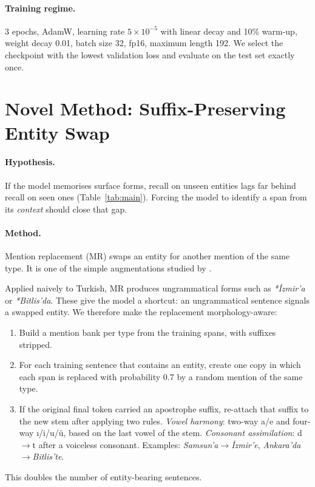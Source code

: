 \documentclass[11pt]{article}
\begin{document}
\paragraph{Training regime.} 3 epochs, AdamW, learning rate $5{\times}10^{-5}$ with linear decay and 10\% warm-up, weight decay 0.01, batch size 32, fp16, maximum length 192. We select the checkpoint with the lowest validation loss and evaluate on the test set exactly once.

\section{Novel Method: Suffix-Preserving Entity Swap}
\paragraph{Hypothesis.} If the model memorises surface forms, recall on unseen entities lags far behind recall on seen ones (Table~\ref{tab:main}). Forcing the model to identify a span from its \emph{context} should close that gap.

\paragraph{Method.} Mention replacement (MR) swaps an entity for another mention of the same type. It is one of the simple augmentations studied by \citet{dai2020analysis}.

Applied naively to Turkish, MR produces ungrammatical forms such as \textit{*İzmir'a} or \textit{*Bitlis'da}. These give the model a shortcut: an ungrammatical sentence signals a swapped entity. We therefore make the replacement morphology-aware:
\begin{enumerate}
\item Build a mention bank per type from the training spans, with suffixes stripped.
\item For each training sentence that contains an entity, create one copy in which each span is replaced with probability 0.7 by a random mention of the same type.
\item If the original final token carried an apostrophe suffix, re-attach that suffix to the new stem after applying two rules. \emph{Vowel harmony}: two-way a/e and four-way ı/i/u/ü, based on the last vowel of the stem. \emph{Consonant assimilation}: d$\to$t after a voiceless consonant. Examples: \textit{Samsun'a}$\to$\textit{İzmir'e}, \textit{Ankara'da}$\to$\textit{Bitlis'te}.
\end{enumerate}
This doubles the number of entity-bearing sentences.
\end{document}
